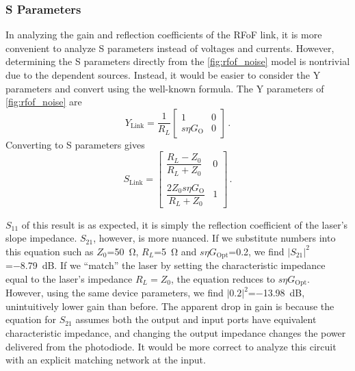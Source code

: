 \subsubsection{S Parameters}

In analyzing the gain and reflection coefficients of the RFoF link, it is more convenient to analyze S parameters instead of voltages and currents.
However, determining the S parameters directly from the \autoref{fig:rfof_noise} model is nontrivial due to the dependent sources.
Instead, it would be easier to consider the Y parameters and convert using the well-known formula.
The Y parameters of \autoref{fig:rfof_noise} are
\begin{equation}
    Y_\text{Link} = \frac{1}{R_L}\begin{bmatrix}
        1 & 0 \\ s\eta G_\text{O} & 0
    \end{bmatrix} \,.
\end{equation}
Converting to S parameters gives
\begin{equation}
    S_\text{Link} = \begin{bmatrix}
        \dfrac{R_L-Z_0}{R_L+Z_0} & 0 \\\\[0.2em] \dfrac{2Z_0s\eta G_\text{O}}{R_L+Z_0} & 1
    \end{bmatrix} \,.
    \label{eq:unmatched_rfof_s}
\end{equation}

$S_{11}$ of this result is as expected, it is simply the reflection coefficient of the laser's slope impedance.
$S_{21}$, however, is more nuanced.
If we substitute numbers into this equation such as $Z_0$=\qty{50}{\ohm}, $R_L$=\qty{5}{\ohm} and $s\eta G_\text{Opt}$=\num{0.2}, we find $|S_{21}|^2$=\qty{-8.79}{dB}.
If we ``match'' the laser by setting the characteristic impedance equal to the laser's impedance $R_L=Z_0$, the equation reduces to $s\eta G_\text{Opt}$.
However, using the same device parameters, we find $|0.2|^2$=\qty{-13.98}{\dB}, unintuitively lower gain than before.
The apparent drop in gain is because the equation for $S_{21}$ assumes both the output and input ports have equivalent characteristic impedance, and changing the output impedance changes the power delivered from the photodiode.
It would be more correct to analyze this circuit with an explicit matching network at the input.

